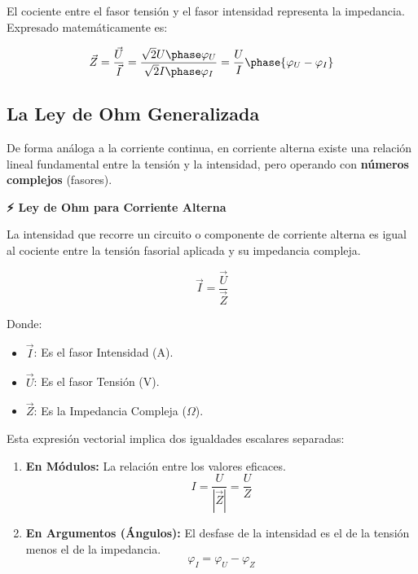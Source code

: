 \documentclass[
  a4paper,
  DIV=11,
  numbers=noendperiod]{scrreprt}
\providecommand{\tightlist}{%
  \setlength{\itemsep}{0pt}\setlength{\parskip}{0pt}}
\begin{document}
El cociente entre el fasor tensión y el fasor intensidad representa la
impedancia. Expresado matemáticamente es:

\[
\vec{Z}=\frac{\vec{U}}{\vec{I}}=\frac{\sqrt{2}U \phase \varphi_U}{\sqrt{2}I \phase \varphi_I}=\frac{U}{I}\phase {\varphi_U-\varphi_I}
\]

\subsection{La Ley de Ohm
Generalizada}\label{la-ley-de-ohm-generalizada}

De forma análoga a la corriente continua, en corriente alterna existe
una relación lineal fundamental entre la tensión y la intensidad, pero
operando con \textbf{números complejos} (fasores).

\begin{tcolorbox}[enhanced jigsaw, breakable, colback=white, left=2mm, leftrule=.75mm, rightrule=.15mm, toprule=.15mm, colframe=quarto-callout-warning-color-frame, arc=.35mm, bottomrule=.15mm, opacityback=0]

\vspace{-3mm}\textbf{⚡ Ley de Ohm para Corriente Alterna}\vspace{3mm}

La intensidad que recorre un circuito o componente de corriente alterna
es igual al cociente entre la tensión fasorial aplicada y su impedancia
compleja.

\[
\vec{I} = \frac{\vec{U}}{\vec{Z}}
\]

Donde:

\begin{itemize}
\tightlist
\item
  \(\vec{I}\): Es el fasor Intensidad (A).
\item
  \(\vec{U}\): Es el fasor Tensión (V).
\item
  \(\vec{Z}\): Es la Impedancia Compleja (\(\Omega\)).
\end{itemize}

\end{tcolorbox}

Esta expresión vectorial implica dos igualdades escalares separadas:

\begin{enumerate}
\def\labelenumi{\arabic{enumi}.}
\tightlist
\item
  \textbf{En Módulos:} La relación entre los valores eficaces.
  \[I = \frac{U}{|\vec{Z}|} = \frac{U}{Z}\]
\item
  \textbf{En Argumentos (Ángulos):} El desfase de la intensidad es el de
  la tensión menos el de la impedancia.
  \[\varphi_I = \varphi_U - \varphi_Z\]
\end{enumerate}
\end{document}
